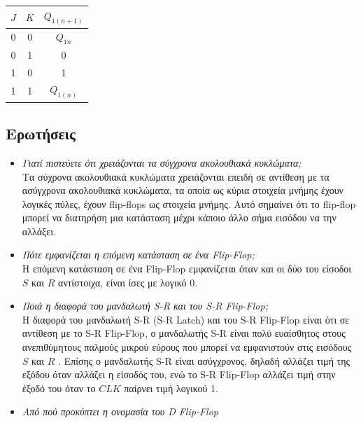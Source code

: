 \documentclass{article}
\begin{document}
\begin{center}
\begin{tabular}{|c|c|c|}
	\hline
	$J$ & $K$ & $Q_{1(n+1)}$ \\
	\hline
	0 & 0 & $Q_{1n}$ \\
	0 & 1 & 0 \\
	1 & 0 & 1 \\
	1 & 1 & $Q_{1(n)}$ \\
	\hline
\end{tabular}
\end{center}

\subsection{Ερωτήσεις}
\begin{itemize}
	\item \textit{Γιατί πιστεύετε ότι χρειάζονται τα σύγχρονα ακολουθιακά κυκλώματα;} \\

	Τα σύχρονα ακολουθιακά κυκλώματα χρειάζονται επειδή σε αντίθεση με τα ασύγχρονα
	ακολουθιακά κυκλώματα, τα οποία ως κύρια στοιχεία μνήμης έχουν λογικές πύλες, έχουν
	flip-flops ως στοιχεία μνήμης. Αυτό σημαίνει ότι το flip-flop μπορεί να διατηρήση μια
	κατάσταση μέχρι κάποιο άλλο σήμα εισόδου να την αλλάξει. \cite{efstathiou} \\

	\item \textit{Πότε εμφανίζεται η επόμενη κατάσταση σε ένα Flip-Flop;} \\
	
	Η επόμενη κατάσταση σε ένα Flip-Flop εμφανίζεται όταν και οι δύο του είσοδοι
	$S$ και $R$ αντίστοιχα, είναι ίσες με λογικό 0. \\

	\item \textit{Ποιά η διαφορά του μανδαλωτή S-R και του S-R Flip-Flop;} \\

	Η διαφορά του μανδαλωτή S-R (S-R Latch) και του S-R Flip-Flop είναι ότι σε
	αντίθεση με το S-R Flip-Flop, ο μανδαλωτής S-R είναι πολύ ευαίσθητος στους
	ανεπιθύμητους παλμούς μικρού εύρους που μπορεί να εμφανιστούν στις εισόδους
	$S$ και $R$ \cite{efstathiou}.
	Επίσης ο μανδαλωτής S-R είναι ασύγχρονος, δηλαδή αλλάζει τιμή της εξόδου
	όταν αλλάζει η είσοδός του, ενώ το S-R Flip-Flop αλλάζει τιμή στην έξοδό του
	όταν το $CLK$ παίρνει τιμή λογικού 1. \\

	\item \textit{Από πού προκύπτει η ονομασία του D Flip-Flop} \\


\end{itemize}
\end{document}
